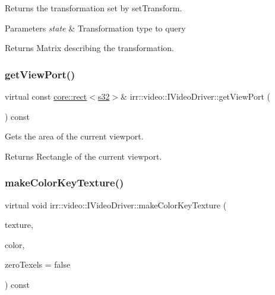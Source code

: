 Returns the transformation set by set\+Transform. 


\begin{DoxyParams}{Parameters}
{\em state} & Transformation type to query \\
\hline
\end{DoxyParams}
\begin{DoxyReturn}{Returns}
Matrix describing the transformation. 
\end{DoxyReturn}
\mbox{\label{classirr_1_1video_1_1IVideoDriver_aa21810374736559e937fcad30ac699b4}} 
\subsubsection{\texorpdfstring{get\+View\+Port()}{getViewPort()}}
{\footnotesize\ttfamily virtual const \hyperlink{classirr_1_1core_1_1rect}{core\+::rect}$<$\hyperlink{namespaceirr_ac66849b7a6ed16e30ebede579f9b47c6}{s32}$>$\& irr\+::video\+::\+I\+Video\+Driver\+::get\+View\+Port (\begin{DoxyParamCaption}{ }\end{DoxyParamCaption}) const\hspace{0.3cm}{\ttfamily [pure virtual]}}



Gets the area of the current viewport. 

\begin{DoxyReturn}{Returns}
Rectangle of the current viewport. 
\end{DoxyReturn}
\mbox{\label{classirr_1_1video_1_1IVideoDriver_a701e7d2101eb26888f57928134bc2ffb}} 
\subsubsection{\texorpdfstring{make\+Color\+Key\+Texture()}{makeColorKeyTexture()}\hspace{0.1cm}{\footnotesize\ttfamily [1/2]}}
{\footnotesize\ttfamily virtual void irr\+::video\+::\+I\+Video\+Driver\+::make\+Color\+Key\+Texture (\begin{DoxyParamCaption}\item[{\hyperlink{classirr_1_1video_1_1ITexture}{video\+::\+I\+Texture} $\ast$}]{texture,  }\item[{\hyperlink{classirr_1_1video_1_1SColor}{video\+::\+S\+Color}}]{color,  }\item[{bool}]{zero\+Texels = {\ttfamily false} }\end{DoxyParamCaption}) const\hspace{0.3cm}{\ttfamily [pure virtual]}}



